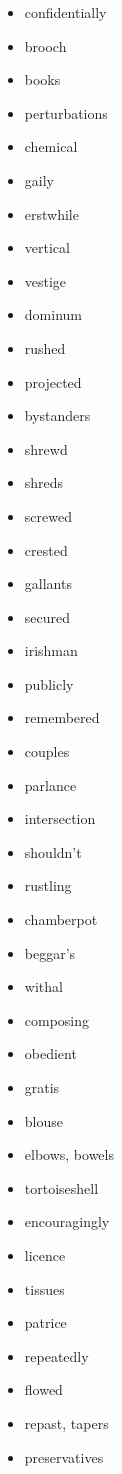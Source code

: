 \documentclass{article}
\begin{document}
\begin{itemize}
    \item confidentially
    \item brooch
    \item books
    \item perturbations
    \item chemical
    \item gaily
    \item erstwhile
    \item vertical
    \item vestige
    \item dominum
    \item rushed
    \item projected
    \item bystanders
    \item shrewd
    \item shreds
    \item screwed
    \item crested
    \item gallants
    \item secured
    \item irishman
    \item publicly
    \item remembered
    \item couples
    \item parlance
    \item intersection
    \item shouldn't
    \item rustling
    \item chamberpot
    \item beggar's
    \item withal
    \item composing
    \item obedient
    \item gratis
    \item blouse
    \item elbows, bowels
    \item tortoiseshell
    \item encouragingly
    \item licence
    \item tissues
    \item patrice
    \item repeatedly
    \item flowed
    \item repast, tapers
    \item preservatives

\end{itemize}
\end{document}

